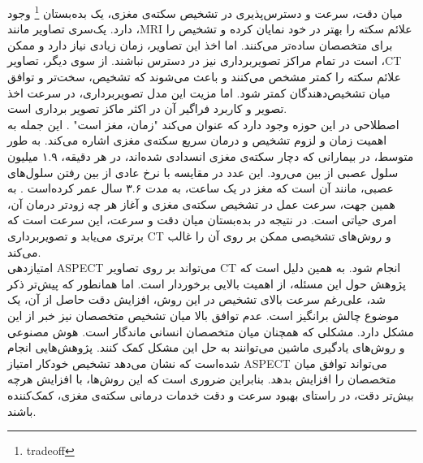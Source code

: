 میان دقت، سرعت و دسترس‌پذیری در تشخیص سکته‌ی مغزی، یک بده‌بستان
\footnote{tradeoff}
وجود دارد.
یک‌سری تصاویر مانند ،MRI علائم سکته را بهتر در خود نمایان کرده و تشخیص را برای متخصصان ساده‌تر می‌کنند.
اما اخذ این تصاویر، زمان زیادی نیاز دارد و ممکن است در تمام مراکز تصویر‌برداری نیز در دسترس نباشند.
از سوی دیگر، تصاویر ،CT علائم سکته را کمتر مشخص می‌کنند و باعث می‌شوند که تشخیص، سخت‌تر و توافق میان تشخیص‌دهندگان کمتر شود.
اما مزیت این مدل تصویربرداری، در سرعت اخذ تصویر و کاربرد فراگیر آن در اکثر ماکز تصویر برداری است.\\
اصطلاحی در این حوزه وجود دارد که عنوان می‌کند "زمان، مغز است" \cite{saver2006time}.
این جمله به اهمیت زمان و لزوم تشخیص و درمان سریع سکته‌ی مغزی اشاره می‌کند.
به طور متوسط، در بیمارانی که دچار سکته‌ی مغزی انسدادی شده‌اند، در هر دقیقه، ۱.۹ میلیون سلول عصبی از بین می‌رود.
این عدد در مقایسه با نرخ عادی از بین رفتن سلول‌های عصبی، مانند آن است که مغز در یک ساعت، به مدت ۳.۶ سال عمر کرده‌است \cite{saver2006time}.
به همین جهت، سرعت عمل در تشخیص سکته‌ی مغزی و آغاز هر چه زودتر درمان آن، امری حیاتی است.
در نتیجه در بده‌بستان میان دقت و سرعت، این سرعت است که برتری می‌یابد و تصویربرداری CT و روش‌های تشخیصی ممکن بر روی آن را غالب می‌کند.\\
امتیازدهی ASPECT می‌تواند بر روی تصاویر CT انجام شود.
به همین دلیل است که پژوهش حول این مسئله، از اهمیت بالایی برخوردار است.
اما همانطور که پیش‌تر ذکر شد، علی‌رغم سرعت بالای تشخیص در این روش، افزایش دقت حاصل از آن، یک موضوع چالش برانگیز است.
عدم توافق بالا میان تشخیص متخصصان نیز خبر از این مشکل دارد.
مشکلی که همچنان میان متخصصان انسانی ماندگار است.
هوش مصنوعی و روش‌های یادگیری ماشین می‌توانند به حل این مشکل کمک کنند.
پژوهش‌هایی انجام شده‌است \cite{chen2022improving}
که نشان می‌دهد تشخیص خودکار امتیاز ASPECT می‌تواند توافق میان متخصصان را افزایش بدهد.
بنابراین ضروری است که این روش‌ها، با افزایش هرچه بیش‌تر دقت، در راستای بهبود سرعت و دقت خدمات درمانی سکته‌ی مغزی، کمک‌کننده باشند.


